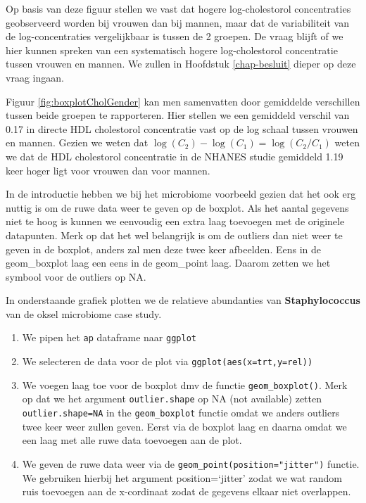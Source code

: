 \documentclass[
  12pt,dutch]{book}
\providecommand{\tightlist}{%
  \setlength{\itemsep}{0pt}\setlength{\parskip}{0pt}}
\theoremstyle{definition}
\theoremstyle{definition}
\theoremstyle{definition}
\theoremstyle{definition}
\theoremstyle{remark}
\begin{document}
Op basis van deze figuur
stellen we vast dat hogere log-cholestorol concentraties
geobserveerd worden bij vrouwen dan bij mannen, maar dat de variabiliteit
van de log-concentraties vergelijkbaar is tussen de 2 groepen. De vraag blijft of we hier kunnen spreken van een systematisch hogere
log-cholestorol concentratie tussen vrouwen en mannen. We zullen in Hoofdstuk \ref{chap-besluit} dieper op deze vraag ingaan.

Figuur \ref{fig:boxplotCholGender} kan men samenvatten door gemiddelde verschillen tussen beide groepen te rapporteren. Hier stellen we een gemiddeld verschil van 0.17 in directe HDL cholestorol concentratie vast op de log schaal tussen vrouwen en mannen.
Gezien we weten dat \(\log(C_2)-\log(C_1)=\log(C_2/C_1)\) weten we dat de HDL cholestorol concentratie in de NHANES studie gemiddeld 1.19 keer hoger ligt voor vrouwen dan voor mannen.

In de introductie hebben we bij het microbiome voorbeeld gezien dat het ook erg nuttig is om de ruwe data weer te geven op de boxplot. Als het aantal gegevens niet te hoog is kunnen we eenvoudig een extra laag toevoegen met de originele datapunten. Merk op dat het wel belangrijk is om de outliers dan niet weer te geven in de boxplot, anders zal men deze twee keer afbeelden. Eens in de geom\_boxplot laag een eens in de geom\_point laag. Daarom zetten we het symbool voor de outliers op NA.

In onderstaande grafiek plotten we de relatieve abundanties van \textbf{Staphylococcus} van de oksel microbiome case study.

\begin{enumerate}
\def\labelenumi{\arabic{enumi}.}
\tightlist
\item
  We pipen het \texttt{ap} dataframe naar \texttt{ggplot}
\item
  We selecteren de data voor de plot via \texttt{ggplot(aes(x=trt,y=rel))}
\item
  We voegen laag toe voor de boxplot dmv de functie \texttt{geom\_boxplot()}. Merk op dat we het argument \texttt{outlier.shape} op NA (not available) zetten \texttt{outlier.shape=NA} in the \texttt{geom\_boxplot} functie omdat we anders outliers twee keer weer zullen geven. Eerst via de boxplot laag en daarna omdat we een laag met alle ruwe data toevoegen aan de plot.
\item
  We geven de ruwe data weer via de \texttt{geom\_point(position="jitter")} functie. We gebruiken hierbij het argument position=`jitter' zodat we wat random ruis toevoegen aan de x-cordinaat zodat de gegevens elkaar niet overlappen.
\end{enumerate}
\end{document}
